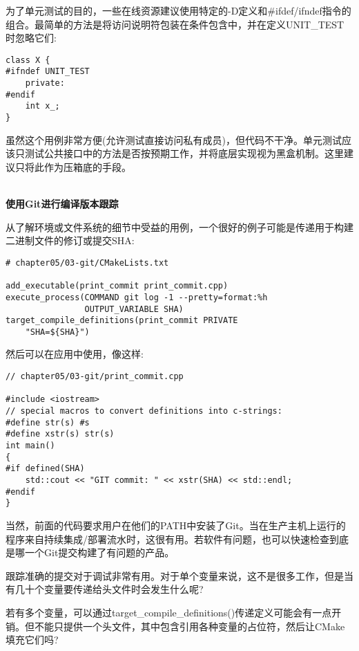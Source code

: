 为了单元测试的目的，一些在线资源建议使用特定的-D定义和\#ifdef/ifndef指令的组合。最简单的方法是将访问说明符包装在条件包含中，并在定义UNIT\_TEST时忽略它们:

\begin{lstlisting}[style=styleCXX]
class X {
#ifndef UNIT_TEST
	private:
#endif
	int x_;
}
\end{lstlisting}

虽然这个用例非常方便(允许测试直接访问私有成员)，但代码不干净。单元测试应该只测试公共接口中的方法是否按预期工作，并将底层实现视为黑盒机制。这里建议只将此作为压箱底的手段。

\hspace*{\fill} \\ %
\noindent
\textbf{使用Git进行编译版本跟踪}

从了解环境或文件系统的细节中受益的用例，一个很好的例子可能是传递用于构建二进制文件的修订或提交SHA:

\begin{lstlisting}[style=styleCMake]
# chapter05/03-git/CMakeLists.txt

add_executable(print_commit print_commit.cpp)
execute_process(COMMAND git log -1 --pretty=format:%h
				OUTPUT_VARIABLE SHA)
target_compile_definitions(print_commit PRIVATE
	"SHA=${SHA}")
\end{lstlisting}  

然后可以在应用中使用，像这样:

\begin{lstlisting}[style=styleCXX]
// chapter05/03-git/print_commit.cpp
	
#include <iostream>
// special macros to convert definitions into c-strings:
#define str(s) #s
#define xstr(s) str(s)
int main()
{
#if defined(SHA)
	std::cout << "GIT commit: " << xstr(SHA) << std::endl;
#endif
}
\end{lstlisting}  

当然，前面的代码要求用户在他们的PATH中安装了Git。当在生产主机上运行的程序来自持续集成/部署流水时，这很有用。若软件有问题，也可以快速检查到底是哪一个Git提交构建了有问题的产品。

跟踪准确的提交对于调试非常有用。对于单个变量来说，这不是很多工作，但是当有几十个变量要传递给头文件时会发生什么呢?


若有多个变量，可以通过target\_compile\_definitions()传递定义可能会有一点开销。但不能只提供一个头文件，其中包含引用各种变量的占位符，然后让CMake填充它们吗?

